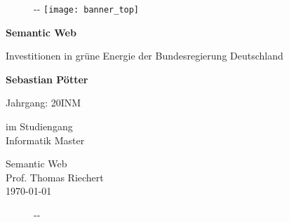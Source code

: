 
\begin{titlepage}
    
    \begin{figure}[t]
        \begin{adjustwidth}{-\oddsidemargin-1in}{-\rightmargin}
            \centering
            \texttt{[image: banner\_top]}
        \end{adjustwidth}
    \end{figure}

    \begin{flushleft}
        \vspace*{1cm}
        \Huge
        \textbf{Semantic Web}
        
        \vspace{0.5cm}
        \LARGE
        Investitionen in grüne Energie der Bundesregierung Deutschland
        
        \vspace{1.5cm}
        \textbf{Sebastian Pötter}
        
        \vspace{0.5cm}
        \large
        Jahrgang: 20INM
        
        \vspace{0.5cm}
        im Studiengang\\
        Informatik Master
        
    \end{flushleft}        

    \vspace{0.5cm}
    \begin{flushright}
        Semantic Web\\
        Prof. Thomas Riechert\\
        \vspace{0.5cm}
        \today
    \end{flushright}    
    
    \begin{figure}[b]
        \begin{adjustwidth}{-\oddsidemargin-1in}{-\rightmargin}
            \centering
        \end{adjustwidth}
    \end{figure}

\end{titlepage}

\restoregeometry